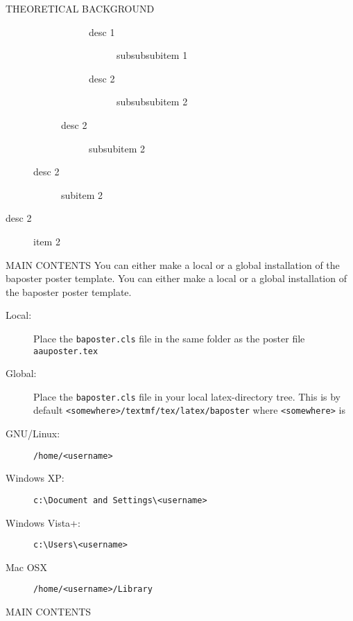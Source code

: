 \documentclass[a0paper,portrait]{baposter}
\begin{document}
\begin{poster}
\begin{posterbox}[name=lists,column=0,below=usage]{THEORETICAL BACKGROUND}
\begin{description}
\begin{description}
\begin{description}
\begin{description}
              \item[desc 1] subsubsubitem 1
              \item[desc 2] subsubsubitem 2
            \end{description}
          \item[desc 2] subsubitem 2
        \end{description}
      \item[desc 2] subitem 2
    \end{description}
  \item[desc 2] item 2
\end{description}
\end{posterbox}
\begin{posterbox}[name=install,column=0,below=lists]{MAIN CONTENTS}
You can either make a local or a global installation of the baposter poster template\cite{baposter}.
You can either make a local or a global installation of the baposter poster template\cite{baposter}.
\begin{description}
  \item[Local:] Place the {\tt baposter.cls} file in the same folder as the poster file {\tt aauposter.tex}
  \item[Global:] Place the {\tt baposter.cls} file in your local latex-directory tree. This is by default {\tt <somewhere>/textmf/tex/latex/baposter} where {\tt <somewhere>} is
 
\end{description}
 \begin{description}
    \item[GNU/Linux:] {\tt/home/<username>}
    \item[Windows XP:] {\tt c:\textbackslash Document and Settings\textbackslash<username>}
    \item[Windows Vista+:] {\tt c:\textbackslash Users\textbackslash<username>}
    \item[Mac OSX] {\tt/home/<username>/Library}
  \end{description}
\end{posterbox}

\begin{posterbox}[name=equation,column=1,below=intro]{MAIN CONTENTS}


\end{posterbox}
\end{poster}
\end{document}
